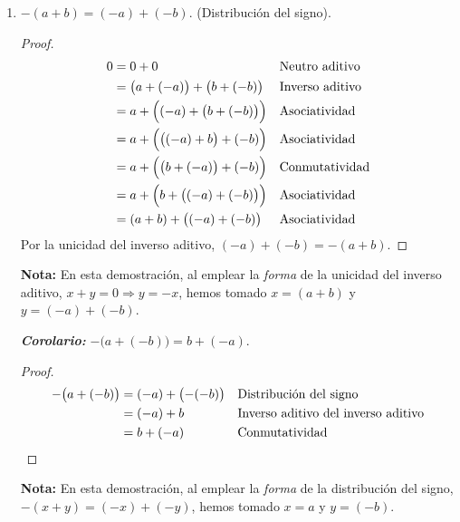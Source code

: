 \documentclass[11pt]{article}
\newcommand{\bfit}[1]{\textbf{\textit{#1}}}
\begin{document}
\begin{enumerate}[label=\alph*)]
\pagebreak

    \item $-(a+b)=(-a)+(-b)$. (Distribución del signo).

    \vspace{-1em}\begin{proof} 
        \begin{align*}
            0 &= 0 + 0 && \text{Neutro aditivo} \\
            &= \bigl(a+(-a)\bigr) + \bigl(b + (-b)\bigr) && \text{Inverso aditivo} \\
            &= a + \Bigl((-a)+ \bigl(b + (-b)\bigr)\Bigr) && \text{Asociatividad} \\
            &= a + \Bigl( \bigl((-a)+b\bigr) +(-b)\Bigr) && \text{Asociatividad} \\
            &= a + \Bigl( \bigl(b+(-a)\bigr) +(-b)\Bigr) && \text{Conmutatividad} \\
            &= a + \Bigl( b + \bigl( (-a)+(-b) \bigr) \Bigr) && \text{Asociatividad} \\
            &= (a+b) + \bigl((-a)+ (-b)\bigr) && \text{Asociatividad}
            \end{align*}
            Por la unicidad del inverso aditivo, $(-a)+ (-b)=-(a+b)$.  
    \end{proof} \vspace{-1em}

    \textbf{Nota:} En esta demostración, al emplear la \textit{forma} de la unicidad del inverso aditivo, $x+y=0 \Longrightarrow y=-x$, hemos tomado $x=(a+b)$ y $y=(-a)+ (-b)$.

    \bfit{Corolario:} $-\bigl(a+(-b)\bigr)=b+(-a)$. \vspace{-1em}
    \begin{proof} 
        \begin{align*}
        -\bigl(a+(-b)\bigr)&= (-a) + \bigl(-(-b)\bigr) &&\text{Distribución del signo} \\
        &= (-a) + b &&\text{Inverso aditivo del inverso aditivo} \\
        &= b +(-a) &&\text{Conmutatividad} \qedhere
        \end{align*}    
    \end{proof} \vspace{-1em}

    \textbf{Nota:} En esta demostración, al emplear la \textit{forma} de la distribución del signo, $-(x+y)=(-x)+(-y)$, hemos tomado $x=a$ y $y=(-b)$.


\end{enumerate}
\end{document}
